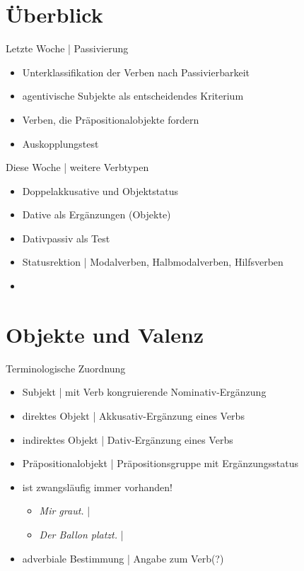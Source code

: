 \section{Überblick}

\begin{frame}
  {Letzte Woche | Passivierung}
  \onslide<+->
  \begin{itemize}[<+->]
    \item Unterklassifikation der Verben nach \alert{Passivierbarkeit}
    \item \alert{agentivische Subjekte} als entscheidendes Kriterium
      \Zeile
    \item Verben, die \alert{Präpositionalobjekte} fordern
    \item Auskopplungstest
  \end{itemize}
\end{frame}

\begin{frame}
  {Diese Woche | weitere Verbtypen}
  \onslide<+->
  \begin{itemize}[<+->]
    \item \alert{Doppelakkusative} und Objektstatus
      \Zeile
    \item \alert{Dative} als Ergänzungen (Objekte)
    \item Dativpassiv als Test
      \Zeile
    \item \alert{Statusrektion} | Modalverben, Halbmodalverben, Hilfsverben
      \Zeile
    \item {}
  \end{itemize}
\end{frame}

\section{Objekte und Valenz}

\begin{frame}
  {Terminologische Zuordnung}
  \onslide<+->
  \begin{itemize}[<+->]
    \item \alert{Subjekt} | mit Verb kongruierende Nominativ-Ergänzung
    \item \alert{direktes Objekt} | Akkusativ-Ergänzung eines Verbs
    \item \alert{indirektes Objekt} | Dativ-Ergänzung eines Verbs
    \item \alert{Präpositionalobjekt} | Präpositionsgruppe mit Ergänzungsstatus
      \Zeile
    \item {} ist zwangsläufig immer vorhanden!
      \begin{itemize}[<+->]
        \item \textit{Mir graut.} | 
        \item \textit{Der Ballon platzt.} | 
      \end{itemize}
      \Zeile
    \item \alert{adverbiale Bestimmung} | Angabe zum Verb(?)
  \end{itemize}
\end{frame}

